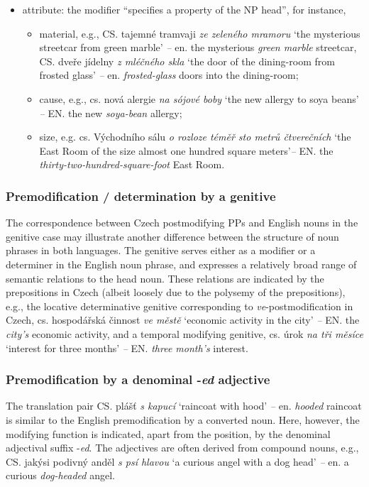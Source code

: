 \documentclass[output=paper]{langscibook}
\begin{document}
\begin{itemize}
\item  attribute: the modifier “specifies a property of the NP head”, for instance,
\begin{itemize}
\item  material, e.g., CS. tajemné tramvaji \textit{ze zeleného mramoru} ‘the mysterious streetcar from green marble’ \textit{–} en. the mysterious \textit{green marble} streetcar, CS. dveře jídelny \textit{z mléčného skla} ‘the door of the dining-room from frosted glass’ \textit{–} en. \textit{frosted-glass} doors into the dining-room;
\item  cause, e.g., cs. nová alergie \textit{na sójové boby} ‘the new allergy to soya beans’ \textit{–} EN. the new \textit{soya-bean} allergy;
\item  size, e.g. cs. Východního sálu \textit{o rozloze téměř sto metrů čtverečních} ‘the East Room of the size almost one hundred square meters’\textit{–} EN. the \textit{thirty-two-hundred-square-foot} East Room.
\end{itemize}
\end{itemize}

\subsubsection{Premodification / determination by a genitive}

The correspondence between Czech postmodifying PPs and English nouns in the genitive case may illustrate another difference between the structure of noun phrases in both languages. The genitive serves either as a modifier or a determiner in the English noun phrase, and expresses a relatively broad range of semantic relations to the head noun. These relations are indicated by the prepositions in Czech (albeit loosely due to the polysemy of the prepositions), e.g., the locative determinative genitive corresponding to \textit{ve}{}-postmodification in Czech, cs. hospodářská činnost \textit{ve městě} ‘economic activity in the city’ \textit{–} EN. the \textit{city’s} economic activity, and a temporal modifying genitive, cs. úrok \textit{na tři měsíce} ‘interest for three months’ \textit{–} EN. \textit{three month’s} interest.

\subsubsection{Premodification by a denominal -\textit{ed} adjective}

The translation pair CS. plášť \textit{s kapucí} ‘raincoat with hood’ \textit{–} en. \textit{hooded} raincoat is similar to the English premodification by a converted noun. Here, however, the modifying function is indicated, apart from the position, by the denominal adjectival suffix -\textit{ed}. The adjectives are often derived from compound nouns, e.g., CS. jakýsi podivný anděl \textit{s psí hlavou} ‘a curious angel with a dog head’ \textit{–} en. a curious \textit{dog-headed} angel.
\end{document}
